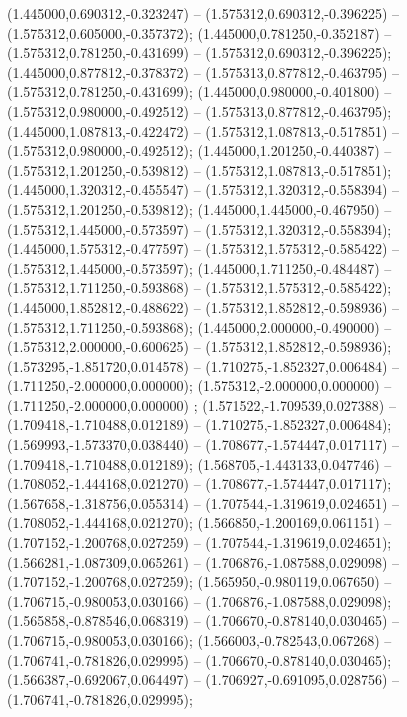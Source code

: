  (1.445000,0.690312,-0.323247) -- (1.575312,0.690312,-0.396225) -- (1.575312,0.605000,-0.357372);
 (1.445000,0.781250,-0.352187) -- (1.575312,0.781250,-0.431699) -- (1.575312,0.690312,-0.396225);
 (1.445000,0.877812,-0.378372) -- (1.575313,0.877812,-0.463795) -- (1.575312,0.781250,-0.431699);
 (1.445000,0.980000,-0.401800) -- (1.575312,0.980000,-0.492512) -- (1.575313,0.877812,-0.463795);
 (1.445000,1.087813,-0.422472) -- (1.575312,1.087813,-0.517851) -- (1.575312,0.980000,-0.492512);
 (1.445000,1.201250,-0.440387) -- (1.575312,1.201250,-0.539812) -- (1.575312,1.087813,-0.517851);
 (1.445000,1.320312,-0.455547) -- (1.575312,1.320312,-0.558394) -- (1.575312,1.201250,-0.539812);
 (1.445000,1.445000,-0.467950) -- (1.575312,1.445000,-0.573597) -- (1.575312,1.320312,-0.558394);
 (1.445000,1.575312,-0.477597) -- (1.575312,1.575312,-0.585422) -- (1.575312,1.445000,-0.573597);
 (1.445000,1.711250,-0.484487) -- (1.575312,1.711250,-0.593868) -- (1.575312,1.575312,-0.585422);
 (1.445000,1.852812,-0.488622) -- (1.575312,1.852812,-0.598936) -- (1.575312,1.711250,-0.593868);
 (1.445000,2.000000,-0.490000) -- (1.575312,2.000000,-0.600625) -- (1.575312,1.852812,-0.598936);
 (1.573295,-1.851720,0.014578) -- (1.710275,-1.852327,0.006484) -- (1.711250,-2.000000,0.000000);
 (1.575312,-2.000000,0.000000) -- (1.711250,-2.000000,0.000000) ;
 (1.571522,-1.709539,0.027388) -- (1.709418,-1.710488,0.012189) -- (1.710275,-1.852327,0.006484);
 (1.569993,-1.573370,0.038440) -- (1.708677,-1.574447,0.017117) -- (1.709418,-1.710488,0.012189);
 (1.568705,-1.443133,0.047746) -- (1.708052,-1.444168,0.021270) -- (1.708677,-1.574447,0.017117);
 (1.567658,-1.318756,0.055314) -- (1.707544,-1.319619,0.024651) -- (1.708052,-1.444168,0.021270);
 (1.566850,-1.200169,0.061151) -- (1.707152,-1.200768,0.027259) -- (1.707544,-1.319619,0.024651);
 (1.566281,-1.087309,0.065261) -- (1.706876,-1.087588,0.029098) -- (1.707152,-1.200768,0.027259);
 (1.565950,-0.980119,0.067650) -- (1.706715,-0.980053,0.030166) -- (1.706876,-1.087588,0.029098);
 (1.565858,-0.878546,0.068319) -- (1.706670,-0.878140,0.030465) -- (1.706715,-0.980053,0.030166);
 (1.566003,-0.782543,0.067268) -- (1.706741,-0.781826,0.029995) -- (1.706670,-0.878140,0.030465);
 (1.566387,-0.692067,0.064497) -- (1.706927,-0.691095,0.028756) -- (1.706741,-0.781826,0.029995);
